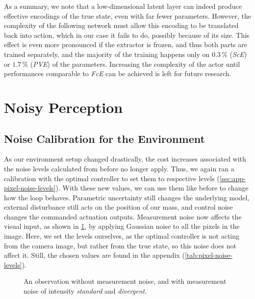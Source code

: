 As a summary, we note that a low-dimensional latent layer can indeed produce effective encodings of the
true state, even with far fewer parameters. However, the complexity of the following network must
allow this encoding to be translated back into action, which in our case it fails to do, possibly because
of its size. This effect is even more pronounced if the extractor is frozen, and thus both parts are trained separately, and the
majority of the training happens only on $0.3\,\%$ (\emph{ScE}) or $1.7\,\%$ (\emph{PVE}) of the parameters. Increasing the complexity of
the actor until performances comparable to \emph{FcE} can be achieved is left for future research.

\section{Noisy Perception}
\label{sec:perception-noise}

\subsection{Noise Calibration for the Environment}
\label{subsec:perception-noise-setting}

As our environment setup changed drastically, the cost increases associated with the noise levels
calculated from before no longer apply. Thus, we again ran a calibration with the optimal controller
to set them to respective levels (\cref{sec:app-pixel-noise-levels}). With these new values, we can use them like before
to change how the loop behaves. Parametric uncertainty still changes the underlying model, external disturbance
still acts on the position of our mass, and control noise changes the commanded actuation outputs.
Measurement noise now affects the visual input, as shown in \cref{fig:pixel-measurement-noise},
by applying Gaussian noise to all the pixels in the image. Here, we set the levels ourselves,
as the optimal controller is not acting from the camera image, but rather from the true state,
so this noise does not affect it. Still, the chosen values are found in the appendix (\cref{tab:pixel-noise-levels}).

\begin{figure}[htbp]
    \centering
    \caption{An observation without measurement noise, and with measurement noise of intensity \emph{standard} and \emph{divergent}.}
    \label{fig:pixel-measurement-noise}
\end{figure}

